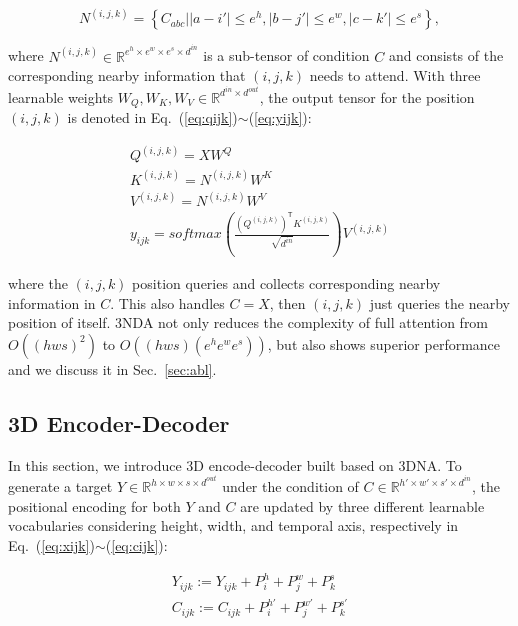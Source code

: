 \begin{small}
\begin{equation} \label{eq:nijk}
N^{(i,j,k)}=\left\{C_{abc}\bigg| \left|a-i'\right|\leq e^h,\left|b-j'\right|\leq e^w,\left|c-k'\right|\leq e^s\right\},
\end{equation}
\end{small}

where $N^{(i,j,k)}\in \mathbb{R}^{e^h\times e^w\times e^s\times d^{in}}$ is a sub-tensor of condition $C$ and consists of the corresponding nearby information that $(i,j,k)$ needs to attend. With three learnable weights $W_Q,W_K,W_V\in \mathbb{R}^{d^{in}\times d^{out}}$, the output tensor for the position $(i,j,k)$ is denoted in Eq.~(\ref{eq:qijk})$\sim$(\ref{eq:yijk}):

\begin{gather}
Q^{(i,j,k)}=XW^Q \label{eq:qijk}  \\
K^{(i,j,k)}=N^{(i, j, k)}W^K \label{eq:kijk} \\
V^{(i,j,k)}=N^{(i, j, k)}W^V \label{eq:vijk}\\
y_{ijk}=softmax\left(\frac{(Q^{(i,j,k)})^\mathsf{T} K^{(i,j,k)}}{\sqrt{d^{in}}}\right)V^{(i,j,k)} \label{eq:yijk} 
\end{gather}

  
where the $(i,j,k)$ position queries and collects corresponding nearby information in $C$. This also handles $C=X$, then $(i,j,k)$ just queries the nearby position of itself. 3NDA not only reduces the complexity of full attention from $O\left(\left(hws\right)^2\right)$ to $O\left(\left(hws\right)\left(e^he^we^s\right)\right)$,  but also shows superior performance and we discuss it in Sec.~\ref{sec:abl}.

\subsection{3D Encoder-Decoder} \label{sec:ed}
In this section, we introduce 3D encode-decoder built based on 3DNA. To generate a target $Y\in \mathbb{R}^{h\times w\times s\times d^{out}}$ under the condition of $C\in \mathbb{R}^{h'\times w'\times s'\times d^{in}}$, the positional encoding for both $Y$ and $C$ are updated by three different learnable vocabularies considering height, width, and temporal axis, respectively in Eq.~(\ref{eq:xijk})$\sim$(\ref{eq:cijk}):

\begin{gather}
Y_{ijk}:=Y_{ijk}+P_i^h+P_j^w+P_k^s \label{eq:xijk} \\
C_{ijk}:=C_{ijk}+P_i^{h'}+P_j^{w'}+P_k^{s'} \label{eq:cijk}
\end{gather}

